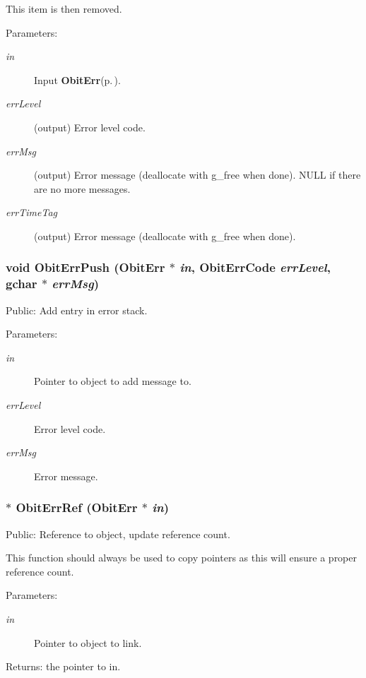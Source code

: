 This item is then removed. \begin{Desc}
\item[Parameters:]
\begin{description}
\item[{\em in}]Input {\bf Obit\-Err}{\rm (p.\,\pageref{structObitErr})}. \item[{\em err\-Level}](output) Error level code. \item[{\em err\-Msg}](output) Error message (deallocate with g\_\-free when done). NULL if there are no more messages. \item[{\em err\-Time\-Tag}](output) Error message (deallocate with g\_\-free when done). \end{description}
\end{Desc}
\subsubsection{\setlength{\rightskip}{0pt plus 5cm}void Obit\-Err\-Push ({\bf Obit\-Err} $\ast$ {\em in}, {\bf Obit\-Err\-Code} {\em err\-Level}, gchar $\ast$ {\em err\-Msg})}\label{ObitErr_8c_a11}


Public: Add entry in error stack. 

\begin{Desc}
\item[Parameters:]
\begin{description}
\item[{\em in}]Pointer to object to add message to. \item[{\em err\-Level}]Error level code. \item[{\em err\-Msg}]Error message. \end{description}
\end{Desc}
\subsubsection{$\ast$ Obit\-Err\-Ref ({\bf Obit\-Err} $\ast$ {\em in})}\label{ObitErr_8c_a7}


Public: Reference to object, update reference count. 

This function should always be used to copy pointers as this will ensure a proper reference count. \begin{Desc}
\item[Parameters:]
\begin{description}
\item[{\em in}]Pointer to object to link. \end{description}
\end{Desc}
\begin{Desc}
\item[Returns:]the pointer to in. \end{Desc}
